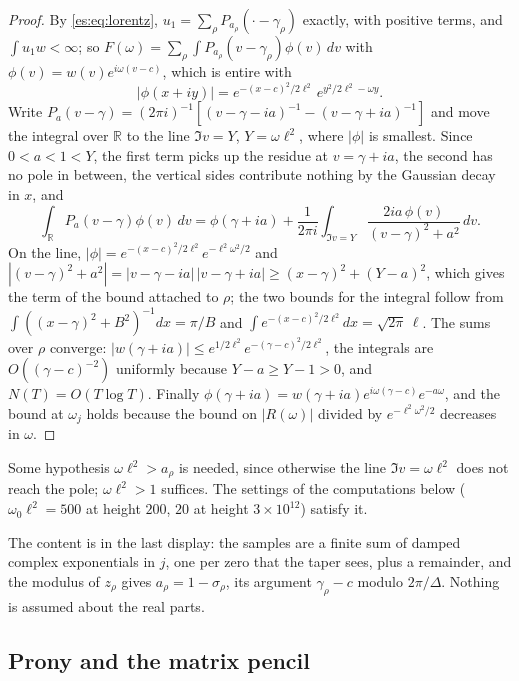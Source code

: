 \begin{proof}
By \eqref{es:eq:lorentz}, $u_1=\sum_\rho P_{a_\rho}(\cdot-\gamma_\rho)$ exactly, with positive terms, and $\int u_1w<\infty$; so $F(\omega)=\sum_\rho\int P_{a_\rho}(v-\gamma_\rho)\phi(v)\,dv$ with $\phi(v)=w(v)e^{i\omega(v-c)}$, which is entire with
\[
|\phi(x+iy)|=e^{-(x-c)^2/2\ell^2}\,e^{y^2/2\ell^2-\omega y}.
\]
Write $P_a(v-\gamma)=(2\pi i)^{-1}[(v-\gamma-ia)^{-1}-(v-\gamma+ia)^{-1}]$ and move the integral over $\mathbb R$ to the line $\Im v=Y$, $Y=\omega\ell^2$, where $|\phi|$ is smallest. Since $0<a<1<Y$, the first term picks up the residue at $v=\gamma+ia$, the second has no pole in between, the vertical sides contribute nothing by the Gaussian decay in $x$, and
\[
\int_{\mathbb R}P_a(v-\gamma)\phi(v)\,dv=\phi(\gamma+ia)+\frac1{2\pi i}\int_{\Im v=Y}\frac{2ia\,\phi(v)}{(v-\gamma)^2+a^2}\,dv .
\]
On the line, $|\phi|=e^{-(x-c)^2/2\ell^2}e^{-\ell^2\omega^2/2}$ and $|(v-\gamma)^2+a^2|=|v-\gamma-ia|\,|v-\gamma+ia|\ge(x-\gamma)^2+(Y-a)^2$, which gives the term of the bound attached to $\rho$; the two bounds for the integral follow from $\int((x-\gamma)^2+B^2)^{-1}dx=\pi/B$ and $\int e^{-(x-c)^2/2\ell^2}dx=\sqrt{2\pi}\,\ell$. The sums over $\rho$ converge: $|w(\gamma+ia)|\le e^{1/2\ell^2}e^{-(\gamma-c)^2/2\ell^2}$, the integrals are $O((\gamma-c)^{-2})$ uniformly because $Y-a\ge Y-1>0$, and $N(T)=O(T\log T)$. Finally $\phi(\gamma+ia)=w(\gamma+ia)e^{i\omega(\gamma-c)}e^{-a\omega}$, and the bound at $\omega_j$ holds because the bound on $|R(\omega)|$ divided by $e^{-\ell^2\omega^2/2}$ decreases in $\omega$.
\end{proof}

Some hypothesis $\omega\ell^2>a_\rho$ is needed, since otherwise the line $\Im v=\omega\ell^2$ does not reach the pole; $\omega\ell^2>1$ suffices. The settings of the computations below ($\omega_0\ell^2=500$ at height $200$, $20$ at height $3\times10^{12}$) satisfy it.

The content is in the last display: the samples are a finite sum of damped complex exponentials in $j$, one per zero that the taper sees, plus a remainder, and the modulus of $z_\rho$ gives $a_\rho=1-\sigma_\rho$, its argument $\gamma_\rho-c$ modulo $2\pi/\Delta$. Nothing is assumed about the real parts.

\subsection{Prony and the matrix pencil}

